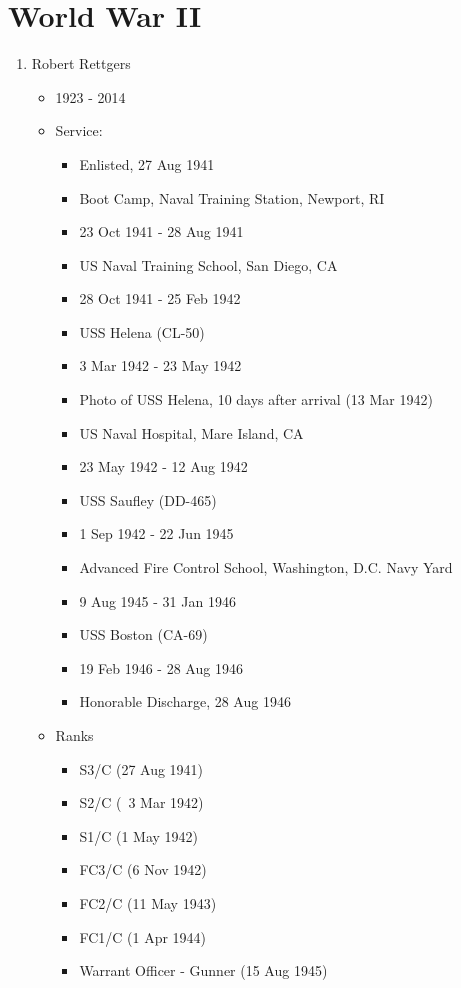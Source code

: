 \documentclass[11pt,letter]{book}
\begin{document}
\chapter{World War II}

\begin{enumerate}

\item Robert Rettgers
\begin{itemize}
\item 1923 - 2014
\item Service:
\begin{itemize}
\item Enlisted, 27 Aug 1941
\item Boot Camp, Naval Training Station, Newport, RI
\item 23 Oct 1941 - 28 Aug 1941
\item US Naval Training School, San Diego, CA
\item 28 Oct 1941 - 25 Feb 1942
\item USS Helena (CL-50)
\item 3 Mar 1942 - 23 May 1942
\item Photo of USS Helena, 10 days after arrival (13 Mar 1942)
\item US Naval Hospital, Mare Island, CA
\item 23 May 1942 - 12 Aug 1942
\item USS Saufley (DD-465)
\item 1 Sep 1942 - 22 Jun 1945
\item Advanced Fire Control School, Washington, D.C. Navy Yard
\item 9 Aug 1945 - 31 Jan 1946
\item USS Boston (CA-69)
\item 19 Feb 1946 - 28 Aug 1946
\item Honorable Discharge, 28 Aug 1946
\end{itemize}
\item Ranks
\begin{itemize}
\item S3/C (27 Aug 1941)
\item S2/C (~3 Mar 1942)
\item S1/C (1 May 1942)
\item FC3/C (6 Nov 1942)
\item FC2/C (11 May 1943)
\item FC1/C (1 Apr 1944)
\item Warrant Officer - Gunner (15 Aug 1945)
\end{itemize}
\end{itemize}


\end{enumerate}
\end{document}
